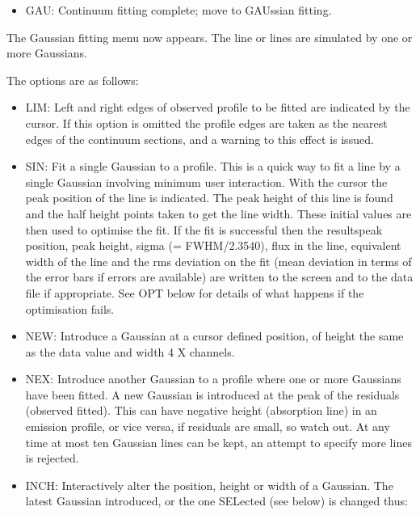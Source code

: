 \begin{itemize}
\item
   GAU: Continuum fitting complete; move to GAUssian fitting.
\end{itemize}

   The Gaussian fitting menu now appears. The line or lines are
   simulated by one or more Gaussians.

   The options are as follows:

\begin{itemize}
\item
   LIM: Left and right edges of observed profile to be fitted are
   indicated by the cursor. If this option is omitted the profile edges
   are taken as the nearest edges of the continuum sections, and a
   warning to this effect is issued.

\item
   SIN: Fit a single Gaussian to a profile. This is a quick way to fit a
   line by a single Gaussian involving minimum user interaction. With
   the cursor the peak position of the line is indicated. The peak
   height of this line is found and the half height points taken to get
   the line width. These initial values are then used to optimise the
   fit. If the fit is successful then the results\latorhtm{---}{-}peak
   position, peak
   height, sigma (= FWHM/2.3540), flux in the line, equivalent width of
   the line and the rms deviation on the fit (mean deviation in terms of
   the error bars if errors are available) are written to the screen and
   to the data file if appropriate. See OPT below for details of what
   happens if the optimisation fails.

\item
   NEW: Introduce a Gaussian at a cursor defined position, of height the
   same as the data value and width 4 X channels.

\item
   NEX: Introduce another Gaussian to a profile where one or more
   Gaussians have been fitted. A new Gaussian is introduced at the peak
   of the residuals (observed \latorhtm{---}{-} fitted). This can have
   negative height
   (absorption line) in an emission profile, or vice versa, if residuals
   are small, so watch out. At any time at most ten Gaussian lines can
   be kept, an attempt to specify more lines is rejected.

\item
   INCH: Interactively alter the position, height or width of a
   Gaussian. The latest Gaussian introduced, or the one SELected (see
   below) is changed thus:


\end{itemize}
